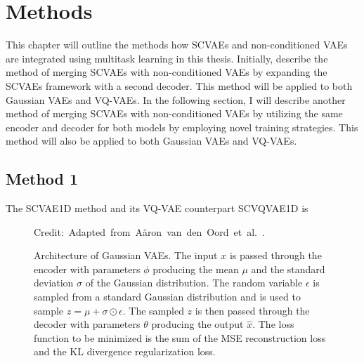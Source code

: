 \chapter{Methods}

This chapter will outline the methods how SCVAEs and non-conditioned VAEs are integrated using multitask learning in this thesis. Initially, describe the method of merging SCVAEs with non-conditioned VAEs by expanding the SCVAEs framework with a second decoder. This method will be applied to both Gaussian VAEs and VQ-VAEs. In the following section, I will describe another method of merging SCVAEs with non-conditioned VAEs by utilizing the same encoder and decoder for both models by employing novel training strategies. This method will also be applied to both Gaussian VAEs and VQ-VAEs.

\section{Method 1}

The SCVAE1D method and its VQ-VAE counterpart SCVQVAE1D is 

\begin{figure}
    \centering 
    
    \caption[Architecture of SCVAE1D.]%
    { 
        Architecture of Gaussian VAEs. The input $x$ is passed through the encoder with parameters $\phi$ producing the mean $\mu$ and the standard deviation $\sigma$ of the Gaussian distribution. The random variable $\epsilon$ is sampled from a standard Gaussian distribution and is used to sample $ z = \mu + \sigma \odot \epsilon$. The sampled $z$ is then passed through the decoder with parameters $\theta$ producing the output $\hat{x}$. The loss function to be minimized is the sum of the MSE reconstruction loss and the KL divergence regularization loss. 
    }
  	\medskip 
	\hspace*{15pt}\hbox{\scriptsize Credit: Adapted from Aäron van den Oord et al.~\cite{vqvae}.}\label{SCVAE1DFigure}
\end{figure}





